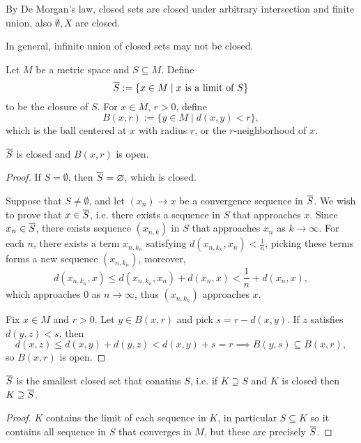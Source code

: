 \begin{rmk}
    By De Morgan's law, closed sets are closed under arbitrary intersection and finite union, also $\emptyset, X$ are closed.

    In general, infinite union of closed sets may not be closed.
\end{rmk}

\begin{df}
    Let $M$ be a metric space and $S\subseteq M$. Define
    \[
    \Bar S := \{x\in M \mid x\text{ is a limit of }S\}
    \]
    to be the closure of $S$.
    For $x\in M$, $r > 0$, define
    \[
    B(x, r) := \{y\in M\mid d(x, y) < r\},
    \]
    which is the ball centered at $x$ with radius $r$, or the $r$-neighborhood of $x$.
\end{df}

\begin{prop}
    $\Bar S$ is closed and $B(x, r)$ is open.

    \begin{proof}
        If $S = \emptyset$, then $\Bar S = \emptyset$, which is closed.

        Suppose that $S\neq \emptyset$, and let $(x_n) \to x$ be a convergence sequence in $\Bar S$. We wish to prove that $x\in \Bar S$, i.e. there exists a sequence in $S$ that approaches $x$. Since $x_n\in \Bar S$, there exists sequence $(x_{n, k})$ in $S$ that approaches $x_n$ as $k\to \infty$. For each $n$, there exists a term $x_{n, k_n}$ satisfying $d(x_{n, k_n}, x_n) < \frac1n$, picking these terms forms a new sequence $(x_{n, k_n})$, moreover, 
        \[
        d(x_{n, k_n}, x) \leq d(x_{n, k_n}, x_n) + d(x_n, x) < \frac1n + d(x_n, x),
        \]
        which approaches $0$ as $n\to\infty$, thus $(x_{n, k_n})$ approaches $x$.

        Fix $x\in M$ and $r > 0$. Let $y \in B(x, r)$ and pick $s = r - d(x, y)$. If $z$ satisfies $d(y, z) < s$, then
        \[
        d(x, z) \leq d(x, y) + d(y, z) < d(x, y) + s = r \implies B(y, s) \subseteq B(x, r),
        \]
        so $B(x, r)$ is open.
    \end{proof}
\end{prop}

\begin{cl}
    \label{cl:smallest-closed-set}
    $\Bar S$ is the smallest closed set that conatins $S$, i.e. if $K\supseteq S$ and $K$ is closed then $K\supseteq \Bar S$.

    \begin{proof}
        $K$ contains the limit of each sequence in $K$, in particular $S\subseteq K$ so it contains all sequence in $S$ that converges in $M$, but these are precisely $\Bar S$.
    \end{proof}
\end{cl}

